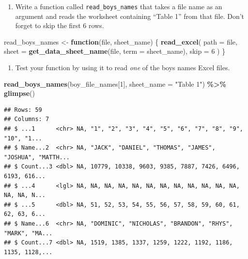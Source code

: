 \documentclass[
]{book}
\newenvironment{Shaded}{\begin{snugshade}}{\end{snugshade}}
\newcommand{\ControlFlowTok}[1]{\textcolor[rgb]{0.13,0.29,0.53}{\textbf{#1}}}
\newcommand{\DataTypeTok}[1]{\textcolor[rgb]{0.13,0.29,0.53}{#1}}
\newcommand{\DecValTok}[1]{\textcolor[rgb]{0.00,0.00,0.81}{#1}}
\newcommand{\KeywordTok}[1]{\textcolor[rgb]{0.13,0.29,0.53}{\textbf{#1}}}
\newcommand{\NormalTok}[1]{#1}
\newcommand{\OperatorTok}[1]{\textcolor[rgb]{0.81,0.36,0.00}{\textbf{#1}}}
\newcommand{\StringTok}[1]{\textcolor[rgb]{0.31,0.60,0.02}{#1}}
\providecommand{\tightlist}{%
  \setlength{\itemsep}{0pt}\setlength{\parskip}{0pt}}
\begin{document}
\begin{alert}

\begin{enumerate}
\def\labelenumi{\arabic{enumi}.}
\tightlist
\item
  Write a function called \texttt{read\_boys\_names} that takes a file name as an argument and reads the worksheet containing ``Table 1'' from that file. Don't forget to skip the first 6 rows.
\end{enumerate}

\begin{Shaded}
\begin{Highlighting}[]
\NormalTok{read\_boys\_names \textless{}{-}}\StringTok{ }\ControlFlowTok{function}\NormalTok{(file, sheet\_name) \{}
  \KeywordTok{read\_excel}\NormalTok{(}
    \DataTypeTok{path =}\NormalTok{ file,}
    \DataTypeTok{sheet =} \KeywordTok{get\_data\_sheet\_name}\NormalTok{(file, }\DataTypeTok{term =}\NormalTok{ sheet\_name),}
    \DataTypeTok{skip =} \DecValTok{6}
\NormalTok{  )}
\NormalTok{\}}
\end{Highlighting}
\end{Shaded}

\begin{enumerate}
\def\labelenumi{\arabic{enumi}.}
\setcounter{enumi}{1}
\tightlist
\item
  Test your function by using it to read \emph{one} of the boys names Excel files.
\end{enumerate}

\begin{Shaded}
\begin{Highlighting}[]
\KeywordTok{read\_boys\_names}\NormalTok{(boy\_file\_names[}\DecValTok{1}\NormalTok{], }\DataTypeTok{sheet\_name =} \StringTok{"Table 1"}\NormalTok{) }\OperatorTok{\%\textgreater{}\%}\StringTok{ }\KeywordTok{glimpse}\NormalTok{()}
\end{Highlighting}
\end{Shaded}

\begin{verbatim}
## Rows: 59
## Columns: 7
## $ ...1      <chr> NA, "1", "2", "3", "4", "5", "6", "7", "8", "9", "10", "1...
## $ Name...2  <chr> NA, "JACK", "DANIEL", "THOMAS", "JAMES", "JOSHUA", "MATTH...
## $ Count...3 <dbl> NA, 10779, 10338, 9603, 9385, 7887, 7426, 6496, 6193, 616...
## $ ...4      <lgl> NA, NA, NA, NA, NA, NA, NA, NA, NA, NA, NA, NA, NA, NA, N...
## $ ...5      <dbl> NA, 51, 52, 53, 54, 55, 56, 57, 58, 59, 60, 61, 62, 63, 6...
## $ Name...6  <chr> NA, "DOMINIC", "NICHOLAS", "BRANDON", "RHYS", "MARK", "MA...
## $ Count...7 <dbl> NA, 1519, 1385, 1337, 1259, 1222, 1192, 1186, 1135, 1128,...
\end{verbatim}


\end{alert}
\end{document}
